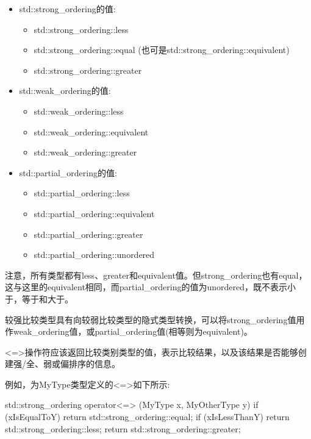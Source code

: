 \begin{itemize}
\item
std::strong\_ordering的值:
\begin{itemize}
\item
std::strong\_ordering::less

\item
std::strong\_ordering::equal (也可是std::strong\_ordering::equivalent)

\item
std::strong\_ordering::greater
\end{itemize}

\item
std::weak\_ordering的值:
\begin{itemize}
\item
std::weak\_ordering::less

\item
std::weak\_ordering::equivalent

\item
std::weak\_ordering::greater
\end{itemize}

\item
std::partial\_ordering的值:
\begin{itemize}
\item
std::partial\_ordering::less

\item
std::partial\_ordering::equivalent

\item
std::partial\_ordering::greater

\item
std::partial\_ordering::unordered
\end{itemize}
\end{itemize}

注意，所有类型都有less、greater和equivalent值。但strong\_ordering也有equal，这与这里的equivalent相同，而partial\_ordering的值为unordered，既不表示小于，等于和大于。

较强比较类型具有向较弱比较类型的隐式类型转换，可以将strong\_ordering值用作weak\_ordering值，或partial\_ordering值(相等则为equivalent)。


<=>操作符应该返回比较类别类型的值，表示比较结果，以及该结果是否能够创建强/全、弱或偏排序的信息。

例如，为MyType类型定义的<=>如下所示:

\begin{cpp}
std::strong_ordering operator<=> (MyType x, MyOtherType y)
{
	if (xIsEqualToY) return std::strong_ordering::equal;
	if (xIsLessThanY) return std::strong_ordering::less;
	return std::strong_ordering::greater;
}
\end{cpp}

